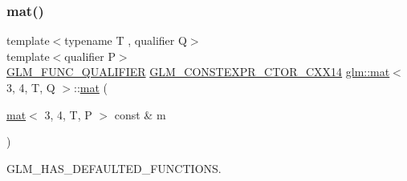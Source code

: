 \mbox{\label{structglm_1_1mat_3_013_00_014_00_01_t_00_01_q_01_4_aa9f1719851a776d4147f74a7883cb577}} 
\subsubsection{\texorpdfstring{mat()}{mat()}\hspace{0.1cm}{\footnotesize\ttfamily [18/21]}}
{\footnotesize\ttfamily template$<$typename T , qualifier Q$>$ \\
template$<$qualifier P$>$ \\
\mbox{\hyperlink{setup_8hpp_a33fdea6f91c5f834105f7415e2a64407}{G\+L\+M\+\_\+\+F\+U\+N\+C\+\_\+\+Q\+U\+A\+L\+I\+F\+I\+ER}} \mbox{\hyperlink{setup_8hpp_a0900f9145e68bf6061b6f5e7be3fa751}{G\+L\+M\+\_\+\+C\+O\+N\+S\+T\+E\+X\+P\+R\+\_\+\+C\+T\+O\+R\+\_\+\+C\+X\+X14}} \mbox{\hyperlink{structglm_1_1mat}{glm\+::mat}}$<$ 3, 4, T, Q $>$\+::\mbox{\hyperlink{structglm_1_1mat}{mat}} (\begin{DoxyParamCaption}\item[{\mbox{\hyperlink{structglm_1_1mat}{mat}}$<$ 3, 4, T, P $>$ const \&}]{m }\end{DoxyParamCaption})}



G\+L\+M\+\_\+\+H\+A\+S\+\_\+\+D\+E\+F\+A\+U\+L\+T\+E\+D\+\_\+\+F\+U\+N\+C\+T\+I\+O\+NS. 

\mbox{\label{structglm_1_1mat_3_013_00_014_00_01_t_00_01_q_01_4_ad1aebdb4ed006b9527f27253b13a54a7}} 
